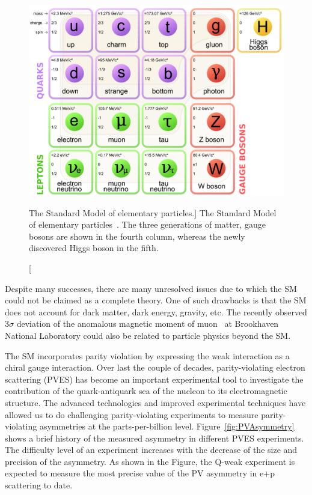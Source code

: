 \begin{singlespace}
\begin{figure}[h]
	\begin{center}
	\includegraphics[width=15.0cm]{figures/SMElementaryParticles}
	\end{center}
	\caption
	[The Standard Model of elementary particles.]
	{The Standard Model of elementary particles~\cite{SM_figure}. The three generations of matter, gauge bosons are shown in the fourth column, whereas the newly discovered Higgs boson in the fifth.}
	\label{fig:SMElementaryParticles}
\end{figure}
\end{singlespace}

Despite many successes, there are many unresolved issues due to which the SM could not be claimed as a complete theory. One of such drawbacks is that the SM does not account for dark matter, dark energy, gravity, etc.
The recently observed 3$\sigma$ deviation of the anomalous magnetic moment of muon~\cite{PhysRevLett.92.161802} at Brookhaven National Laboratory could also be related to particle physics beyond the SM. 

The SM incorporates parity violation by expressing the weak interaction as a chiral gauge interaction. Over last the couple of decades, parity-violating electron scattering (PVES) has become an important experimental tool to investigate the contribution of the quark-antiquark sea of the nucleon to its electromagnetic structure. The advanced technologies and improved experimental techniques have allowed us to do challenging parity-violating experiments to measure parity-violating asymmetries at the parts-per-billion level.
Figure~\ref{fig:PVAsymmetry} shows a brief history of the measured asymmetry in different PVES experiments. The difficulty level of an experiment increases with the decrease of the size and precision of the asymmetry.  As shown in the Figure, the Q-weak experiment is expected to measure the most precise value of the PV asymmetry in e+p scattering to date. 

